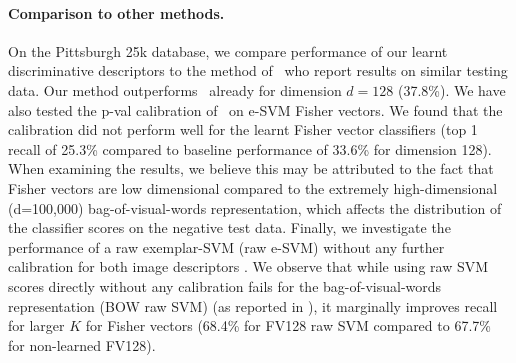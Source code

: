 \documentclass[10pt,twocolumn,letterpaper]{article}
\begin{document}
      \paragraph{Comparison to other methods.}
         \textcolor{petr}{
         On the Pittsburgh 25k database, we compare performance of our learnt discriminative descriptors to the method of~\cite{Gronat13} who report results on similar testing data. Our method outperforms~\cite{Gronat13} already for dimension $d=128$ (37.8\%).
         We have also tested the p-val calibration of~\cite{Gronat13} on e-SVM Fisher vectors. We found that the calibration did not perform well for the learnt Fisher vector classifiers (top 1 recall of 25.3\% compared to baseline performance of 33.6\% for dimension 128). When examining the results, we believe this may be attributed to the fact that Fisher vectors are low dimensional compared to the extremely high-dimensional (d=100,000) bag-of-visual-words representation, which affects the distribution of the classifier scores on the negative test data.
         Finally, we investigate the performance of a raw exemplar-SVM (raw e-SVM) without any further calibration for both image descriptors . We observe that while using raw SVM scores directly without any calibration fails for the bag-of-visual-words representation (BOW raw SVM) (as reported in \cite{Gronat13}), it marginally improves recall for larger $K$ for Fisher vectors (68.4\% for FV128 raw SVM compared to 67.7\% for non-learned FV128).
        }
\end{document}
